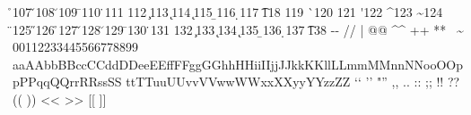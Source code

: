   {\r}{107}%
  {\v}{108}%
  {\u}{109}%
  {\=}{110}%
  {\.}{111}%
  {\textcommabelow}{112}%
  {\c}{113}%
  {\textogonekcentered}{114}%
  {\k}{115}%
  {\b}{116}%
  {\d}{117}%
  {\t}{118}%
  {\@ml@f}{119}%
  {\@ml@f\string\`}{120}%
  {\@ml@f\string\textcommaabove}{121}%
  {\@ml@f\string\'}{122}%
  {\@ml@f\string\^}{123}%
  {\@ml@f\string\~}{124}%
  {\@ml@f\string\"}{125}%
  {\@ml@f\string\H}{126}%
  {\@ml@f\string\r}{127}%
  {\@ml@f\string\v}{128}%
  {\@ml@f\string\u}{129}%
  {\@ml@f\string\=}{130}%
  {\@ml@f\string\.}{131}%
  {\@ml@f\string\textcommabelow}{132}%
  {\@ml@f\string\c}{133}%
  {\@ml@f\string\textogonekcentered}{134}%
  {\@ml@f\string\k}{135}%
  {\@ml@f\string\b}{136}%
  {\@ml@f\string\d}{137}%
  {\@ml@f\string\t}{138}%
  \sentinel\sentinel%
\@def@tr@table%
  \spacetok{\ }%
  {-}{\@tt@space-}%
  {/}{\slash}%
  {|}{\textbar}%
  {@}{@}%
  {^}{\textasciicircum}%
  {+}{+}%
  {*}{*}%
  {~}{\textasciitilde}%
  00112233445566778899%
  aaAAbbBBccCCddDDeeEEffFFggGGhhHHiiIIjjJJkkKKllLLmmMMnnNNooOOppPPqqQQrrRRssSS%
  ttTTuuUUvvVVwwWWxxXXyyYYzzZZ%
  {`}{\textquoteleft}%
  {'}{\textquoteright}%
  {"}{\textquotedblright}%
  {,}{\@tt@punct,}%
  {.}{\@tt@punct.}%
  {:}{\@tt@punct:}%
  {;}{\@tt@punct;}%
  {!}{\@tt@punct!}%
  {?}{\@tt@punct?}%
  {(}{\@tt@punct(}%
  {)}{\@tt@punct)}%
  {<}{\@tt@punct<}%
  {>}{\@tt@punct>}%
  {[}{\@tt@punct[}%
  {]}{\@tt@punct]}%
  \sentinel\sentinel%
\def\@do@spaces{%
  \do\ \do\textvisiblespace\do\slash\do\textbar\do\textbackslash\do\textendash%
  \do\textemdash\do\_\do\textunderscore%
}%
\def\@do@text@symbols{%
  \do\Orb\do\copyright\do\textasciicircum\do\textasciitilde%
  \do\#\do\$\do\textdollar\do\textsterling\do\%\do\textperthousand%
    \do\textpertenthousand\do\&%
  \do\S\do\textsection\do\dag\do\ddag\do\P%
}%
\def\@do@logos{%
  \do\TeX%
}%
